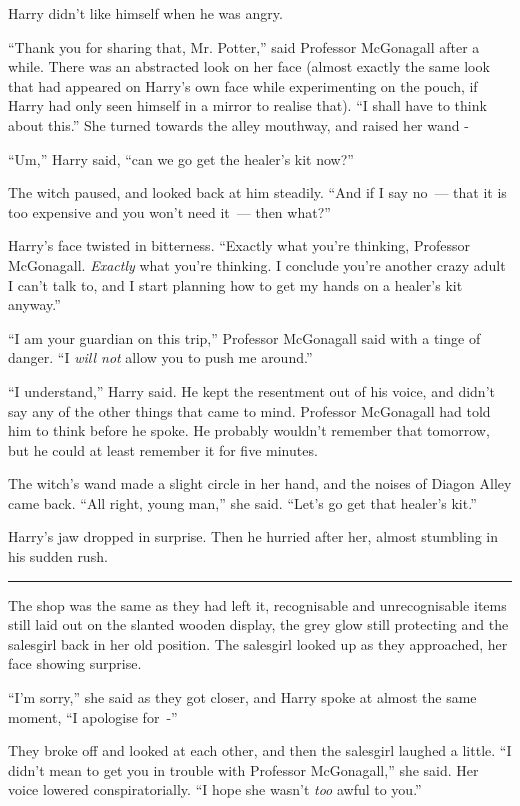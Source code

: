 Harry didn't like himself when he was angry.

``Thank you for sharing that, Mr. Potter,'' said Professor McGonagall after a while. There was an abstracted look on her face (almost exactly the same look that had appeared on Harry's own face while experimenting on the pouch, if Harry had only seen himself in a mirror to realise that). ``I shall have to think about this.'' She turned towards the alley mouthway, and raised her wand -

``Um,'' Harry said, ``can we go get the healer's kit now?''

The witch paused, and looked back at him steadily. ``And if I say no~--- that it is too expensive and you won't need it~--- then what?''

Harry's face twisted in bitterness. ``Exactly what you're thinking, Professor McGonagall. \emph{Exactly} what you're thinking. I conclude you're another crazy adult I can't talk to, and I start planning how to get my hands on a healer's kit anyway.''

``I am your guardian on this trip,'' Professor McGonagall said with a tinge of danger. ``I \emph{will not} allow you to push me around.''

``I understand,'' Harry said. He kept the resentment out of his voice, and didn't say any of the other things that came to mind. Professor McGonagall had told him to think before he spoke. He probably wouldn't remember that tomorrow, but he could at least remember it for five minutes.

The witch's wand made a slight circle in her hand, and the noises of Diagon Alley came back. ``All right, young man,'' she said. ``Let's go get that healer's kit.''

Harry's jaw dropped in surprise. Then he hurried after her, almost stumbling in his sudden rush.

\begin{center}\rule{3in}{0.4pt}\end{center}

The shop was the same as they had left it, recognisable and unrecognisable items still laid out on the slanted wooden display, the grey glow still protecting and the salesgirl back in her old position. The salesgirl looked up as they approached, her face showing surprise.

``I'm sorry,'' she said as they got closer, and Harry spoke at almost the same moment, ``I apologise for~-''

They broke off and looked at each other, and then the salesgirl laughed a little. ``I didn't mean to get you in trouble with Professor McGonagall,'' she said. Her voice lowered conspiratorially. ``I hope she wasn't \emph{too} awful to you.''

